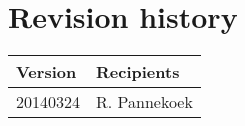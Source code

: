 \chapter*{Revision history}

\begin{tabular}{| p{5cm} | p{8cm} |}
	\hline
	Version & Recipients \\ \hline
	20140324 & R. Pannekoek \\
	\hline
\end{tabular}
